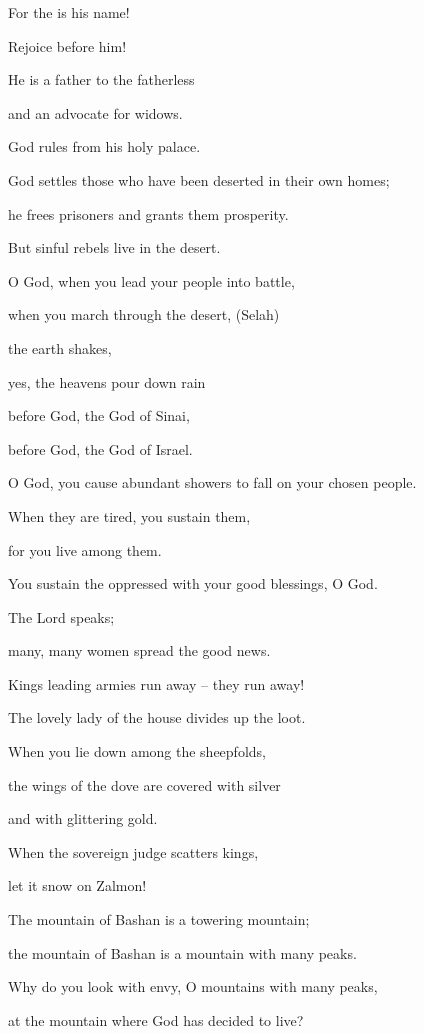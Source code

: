 {\par }{\Q For the
{}
is his name!

\par }{\Q Rejoice
before him!
\par }{\Q {}He is a father
to the fatherless
\par }{\Q and an advocate
for widows.
\par }{\Q God
rules
from his holy palace.
\par }{\Q {}God
settles
those who have been deserted
in their own homes;
\par }{\Q he frees
prisoners
and grants them prosperity.
\par }{\Q But
sinful rebels
live
in the desert.
\par }{\Q {}O God,
when you lead
your people
into battle,

\par }{\Q when you march
through the desert,
(Selah)
\par }{\Q {}the earth
shakes,
\par }{\Q yes,
the heavens
pour down rain
\par }{\Q before
God, the God
of Sinai,
\par }{\Q before
God,
the God
of Israel.
\par }{\Q {}O God,
you cause abundant showers
to fall on your chosen
people.

\par }{\Q When they are tired,
you
sustain them,
\par }{\Q {}for you live
among
them.

\par }{\Q You sustain
the oppressed
with your good
blessings, O God.
\par }{\Q {}The Lord
speaks;
\par }{\Q many, many women
spread the good news.
\par }{\Q {}Kings
leading
armies
run away
– they run away!

\par }{\Q The lovely
lady
of the house
divides
up the loot.
\par }{\Q {}When
you lie
down among
the sheepfolds,
\par }{\Q the wings
of the dove
are covered
with silver
\par }{\Q and with glittering
gold.
\par }{\Q {}When
the sovereign
judge
scatters
kings,
\par }{\Q let it snow
on Zalmon!
\par }{\Q {}The mountain
of Bashan
is a towering mountain;
\par }{\Q the mountain
of Bashan
is a mountain with many peaks.
\par }{\Q {}Why
do you look with envy,
O mountains
with many peaks,
\par }{\Q at the mountain
where God
has decided to live?

}
